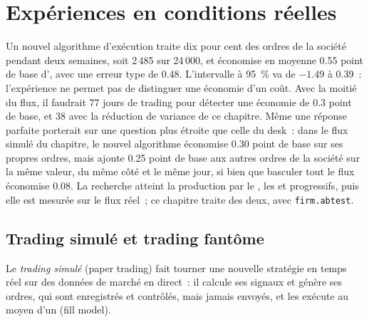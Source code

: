 \chapter{Expériences en conditions réelles}\label{ch:rs:live-experiments}

Un nouvel algorithme d'exécution traite dix pour cent des ordres de la société pendant deux semaines, soit 2\,485 sur 24\,000, et économise
en moyenne 0.55 point de base d', avec une erreur type de 0.48. L'intervalle à 95~\% va de $-1.49$ à 0.39~: l'expérience ne permet pas de distinguer une économie d'un coût. Avec la moitié du flux, il
faudrait 77 jours de trading pour détecter une économie de 0.3 point de base, et 38 avec la réduction de variance de ce chapitre. Même une réponse parfaite porterait sur une
question plus étroite que celle du desk~: dans le flux simulé du chapitre, le nouvel algorithme économise 0.30 point de base sur ses propres ordres, mais ajoute 0.25 point de base aux autres ordres de
la société sur la même valeur, du même côté et le même jour, si bien que basculer tout le flux économise 0.08. La recherche atteint la production par le , les 
et progressifs, puis elle est mesurée sur le flux réel~; ce chapitre traite des deux, avec \texttt{firm.abtest}.

\section{Trading simulé et trading fantôme}

\begin{definition}\label{def:rs:live-experiments:paper}
Le \emph{trading simulé} (paper trading) fait tourner une nouvelle stratégie en temps réel sur des données de marché en direct~: il calcule ses signaux et génère ses ordres, qui sont
enregistrés et contrôlés, mais jamais envoyés, et les exécute au moyen d'un  (fill model).
\end{definition}

